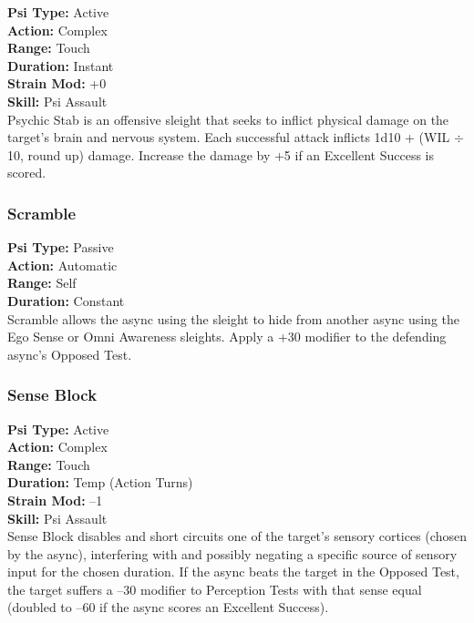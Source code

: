 \textbf{Psi Type:} Active \\ \textbf{Action:} Complex \\ \textbf{Range:} Touch \\ \textbf{Duration:} Instant \\ \textbf{Strain Mod:} +0 \\ \textbf{Skill:} Psi Assault \\ Psychic Stab is an offensive sleight that seeks to inflict physical damage on the target’s brain and nervous system. Each successful attack inflicts 1d10 + (WIL $\div$ 10, round up) damage. Increase the damage by +5 if an Excellent Success is scored. 

\subsubsection{Scramble} \textbf{Psi Type:} Passive \\ \textbf{Action:} Automatic \\ \textbf{Range:} Self \\ \textbf{Duration:} Constant \\ Scramble allows the async using the sleight to hide from another async using the Ego Sense or Omni Awareness sleights. Apply a +30 modifier to the defending async’s Opposed Test. 

\subsubsection{Sense Block} \textbf{Psi Type:} Active \\ \textbf{Action:} Complex \\ \textbf{Range:} Touch \\ \textbf{Duration:} Temp (Action Turns) \\ \textbf{Strain Mod:} –1 \\ \textbf{Skill:} Psi Assault \\ Sense Block disables and short circuits one of the target’s sensory cortices (chosen by the async), interfering with and possibly negating a specific source of sensory input for the chosen duration. If the async beats the target in the Opposed Test, the target suffers a –30 modifier to Perception Tests with that sense equal (doubled to –60 if the async scores an Excellent Success). 



